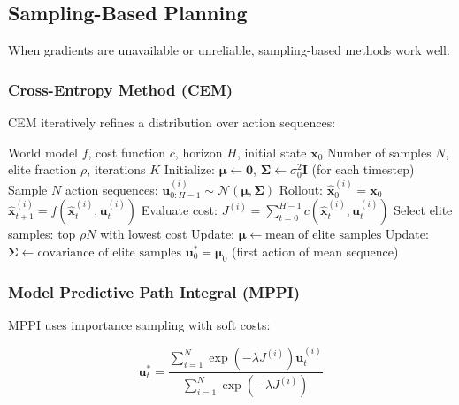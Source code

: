 \subsection{Sampling-Based Planning}

When gradients are unavailable or unreliable, sampling-based methods work well.

\subsubsection{Cross-Entropy Method (CEM)}

CEM iteratively refines a distribution over action sequences:

\begin{algorithm}[H]
\caption{Cross-Entropy Method for Planning}
\begin{algorithmic}[1]
\Require World model $f$, cost function $c$, horizon $H$, initial state $\mathbf{x}_0$
\Require Number of samples $N$, elite fraction $\rho$, iterations $K$
\State Initialize: $\boldsymbol{\mu} \gets \mathbf{0}$, $\boldsymbol{\Sigma} \gets \sigma_0^2 \mathbf{I}$ (for each timestep)
    \State Sample $N$ action sequences: $\mathbf{u}_{0:H-1}^{(i)} \sim \mathcal{N}(\boldsymbol{\mu}, \boldsymbol{\Sigma})$
        \State Rollout: $\hat{\mathbf{x}}_0^{(i)} = \mathbf{x}_0$
            \State $\hat{\mathbf{x}}_{t+1}^{(i)} = f(\hat{\mathbf{x}}_t^{(i)}, \mathbf{u}_t^{(i)})$
        \EndFor
        \State Evaluate cost: $J^{(i)} = \sum_{t=0}^{H-1} c(\hat{\mathbf{x}}_t^{(i)}, \mathbf{u}_t^{(i)})$
    \EndFor
    \State Select elite samples: top $\rho N$ with lowest cost
    \State Update: $\boldsymbol{\mu} \gets \text{mean of elite samples}$
    \State Update: $\boldsymbol{\Sigma} \gets \text{covariance of elite samples}$
\EndFor
\State \Return $\mathbf{u}_0^* = \boldsymbol{\mu}_0$ (first action of mean sequence)
\end{algorithmic}
\end{algorithm}

\subsubsection{Model Predictive Path Integral (MPPI)}

MPPI uses importance sampling with soft costs:

\begin{equation}
\mathbf{u}_t^* = \frac{\sum_{i=1}^N \exp(-\lambda J^{(i)}) \mathbf{u}_t^{(i)}}{\sum_{i=1}^N \exp(-\lambda J^{(i)})}
\end{equation}

